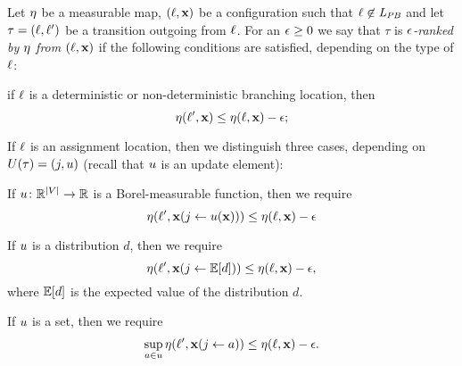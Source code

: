 \begin{definition}
\label{def:rank1}
Let $\eta$ be a measurable map, $(\ell,\mathbf{x})$ be a configuration such that 
$\ell\not\in \mathit{L}_{\mathit{PB}}$ and let 
$\tau=(\ell,\ell')$ be a 
transition outgoing from $\ell$. For an $\epsilon\geq 0$ we say that $\tau$ is 
\emph{$\epsilon$-ranked by $\eta$ from $(\ell,\mathbf{x})$} if the following 
conditions are 
satisfied, depending on the type of $\ell$:
\begin{compactitem} %
		\item 
		if $\ell$ is a deterministic or non-deterministic branching location, 
		then
		$$\eta(\ell',\mathbf{x}) \leq 
		\eta(\ell,\mathbf{x})-\epsilon;$$
		
		
		\item 
		If $\ell$ is an assignment location, then we distinguish 
		three cases, depending on $U(\tau)=(j,u)$ (recall that $u$ 
is an update element):
		\begin{compactitem}
			\item If $u\colon \mathbb{R}^{|V|}\rightarrow \mathbb{R}$ is a 
Borel-measurable function, then we require
			$$\eta(\ell',\mathbf{x}(j\leftarrow 
u(\mathbf{x}))) \leq \eta(\ell,\mathbf{x})-\epsilon$$
			\item If $u$ is a distribution $d$, then we require $$ 
			\eta(\ell',\mathbf{x}(j\leftarrow \mathbb{E}[d])) \leq 
			\eta(\ell,\mathbf{x})-\epsilon,$$ 
			where $\mathbb{E}[d]$ is the 
expected value of the 
			distribution $d$.
			\item 
			If $u$ is a set, then we require $$\sup_{a\in u}
			\eta(\ell',\mathbf{x}(j \leftarrow a)) \leq \eta(\ell,\mathbf{x})-\epsilon.$$
		\end{compactitem}
		
	\end{compactitem}
\end{definition}


